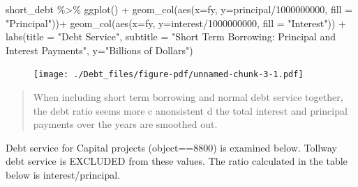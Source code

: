 \documentclass[
  letterpaper,
  DIV=11,
  numbers=noendperiod]{scrreport}
\newenvironment{Shaded}{\begin{snugshade}}{\end{snugshade}}
\newcommand{\AttributeTok}[1]{\textcolor[rgb]{0.40,0.45,0.13}{#1}}
\newcommand{\DecValTok}[1]{\textcolor[rgb]{0.68,0.00,0.00}{#1}}
\newcommand{\FunctionTok}[1]{\textcolor[rgb]{0.28,0.35,0.67}{#1}}
\newcommand{\NormalTok}[1]{\textcolor[rgb]{0.00,0.23,0.31}{#1}}
\newcommand{\SpecialCharTok}[1]{\textcolor[rgb]{0.37,0.37,0.37}{#1}}
\newcommand{\StringTok}[1]{\textcolor[rgb]{0.13,0.47,0.30}{#1}}
\begin{document}
\begin{Shaded}
\begin{Highlighting}[]
\NormalTok{short\_debt }\SpecialCharTok{\%\textgreater{}\%} \FunctionTok{ggplot}\NormalTok{() }\SpecialCharTok{+} 
  \FunctionTok{geom\_col}\NormalTok{(}\FunctionTok{aes}\NormalTok{(}\AttributeTok{x=}\NormalTok{fy, }\AttributeTok{y=}\NormalTok{principal}\SpecialCharTok{/}\DecValTok{1000000000}\NormalTok{, }\AttributeTok{fill =} \StringTok{"Principal"}\NormalTok{))}\SpecialCharTok{+} 
  \FunctionTok{geom\_col}\NormalTok{(}\FunctionTok{aes}\NormalTok{(}\AttributeTok{x=}\NormalTok{fy, }\AttributeTok{y=}\NormalTok{interest}\SpecialCharTok{/}\DecValTok{1000000000}\NormalTok{, }\AttributeTok{fill =} \StringTok{"Interest"}\NormalTok{)) }\SpecialCharTok{+} 
  \FunctionTok{labs}\NormalTok{(}\AttributeTok{title =} \StringTok{"Debt Service"}\NormalTok{, }\AttributeTok{subtitle =} \StringTok{"Short Term Borrowing: Principal and Interest Payments"}\NormalTok{, }\AttributeTok{y=}\StringTok{"Billions of Dollars"}\NormalTok{)}
\end{Highlighting}
\end{Shaded}

\begin{figure}[H]

{\centering \texttt{[image: ./Debt\_files/figure-pdf/unnamed-chunk-3-1.pdf]}

}

\end{figure}

\begin{quote}
When including short term borrowing and normal debt service together,
the debt ratio seems more c anonsistent d the total interest and
principal payments over the years are smoothed out.
\end{quote}

Debt service for Capital projects (object==8800) is examined below.
Tollway debt service is EXCLUDED from these values. The ratio calculated
in the table below is interest/principal.
\end{document}
